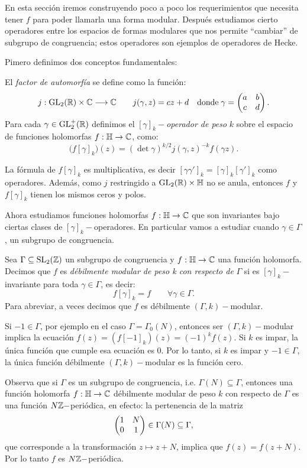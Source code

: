 \documentclass[../../tesis_maestria]{subfiles}
\begin{document}
En esta secci\'on iremos construyendo poco a poco los requerimientos que necesita tener $f$ para
poder llamarla una forma modular. Despu\'es estudiamos cierto operadores entre los espacios de
formas modulares que nos permite ``cambiar'' de subgrupo de congruencia; estos operadores son
ejemplos de operadores de Hecke. 

Pimero definimos dos conceptos fundamentales:

\begin{defin}
  El \emph{factor de automorf\'ia} se define como la funci\'on:
  \[
    j:\mathrm{GL}_2(\mathbb{R})\times\mathbb{C}\longrightarrow\mathbb{C} \qquad j(\gamma,z)=cz+d\quad
    \mathrm{donde}\; \gamma=\begin{pmatrix}a & b\\ c & d\end{pmatrix}.
  \]
  Para cada $\gamma\in\mathrm{GL}_2^+(\mathbb{R})$ definimos el $[\gamma]_k-$\emph{operador de peso} $k$ sobre el
  espacio de funciones holomorfas $f:\mathbb{H}\rightarrow\mathbb{C}$, como:
  \[
    \big(f[\gamma]_k\big)(z)=(\det\gamma)^{k/2}j(\gamma,z)^{-k}f(\gamma z).
  \]
\end{defin}

\begin{notas}
  La f\'ormula de $f[\gamma]_k$ es multiplicativa, es decir
  $[\gamma\gamma']_k=[\gamma]_k[\gamma']_k$ como operadores. Adem\'as, como $j$ restringido a
  $\mathrm{GL}_2(\mathbb{R})\times\mathbb{H}$ no se anula, entonces $f$ y $f[\gamma]_k$ tienen los mismos ceros y polos.
\end{notas}

Ahora estudiamos funciones holomorfas $f:\mathbb{H}\rightarrow\mathbb{C}$ que son invariantes bajo ciertas clases de
$[\gamma]_k-$operadores. En particular vamos a estudiar cuando $\gamma\in\Gamma$, un subgrupo
de congruencia.

\begin{defin}
  Sea $\Gamma\subseteq\mathrm{SL}_2(\mathbb{Z})$ un subgrupo de congruencia y $f:\mathbb{H}\rightarrow\mathbb{C}$ una funci\'on
  holomorfa. Decimos que $f$ es \emph{d\'ebilmente modular de peso k con respecto de} $\Gamma$
  si es $[\gamma]_k-$invariante para toda $\gamma\in\Gamma$, es decir:
  \[
    f[\gamma]_k=f \qquad\forall\gamma\in\Gamma.
  \]
  Para abreviar, a veces decimos que $f$ es d\'ebilmente $(\Gamma,k)-$modular.
\end{defin}
\begin{nota}
  Si $-1\in\Gamma$, por ejemplo en el caso $\Gamma=\Gamma_0(N)$, entonces ser $(\Gamma,k)-$modular
  implica la ecuaci\'on $f(z)=(f[-1]_k)(z)=(-1)^kf(z)$. Si $k$ es impar, la \'unica funci\'on que
  cumple esa ecuaci\'on es $0$. Por lo tanto, si $k$ es impar y $-1\in\Gamma$, la \'unica
  funci\'on d\'ebilmente $(\Gamma,k)-$modular es la funci\'on cero.
\end{nota}
Observa que si $\Gamma$ es un subgrupo de congruencia, i.e. $\Gamma(N)\subseteq\Gamma$, entonces
una funci\'on holomorfa $f:\mathbb{H}\rightarrow\mathbb{C}$ d\'ebilmente modular de peso $k$ con respecto de $\Gamma$
es una funci\'on $N\mathbb{Z}-$peri\'odica, en efecto: la pertenencia de la matriz
\[
  \begin{pmatrix}1 & N\\ 0 & 1\end{pmatrix}\in\Gamma(N)\subseteq\Gamma,
\]
que corresponde a la transformaci\'on $z\mapsto z+N$, implica que $f(z)=f(z+N)$. Por lo tanto
$f$ es $N\mathbb{Z}-$peri\'odica.
\end{document}
